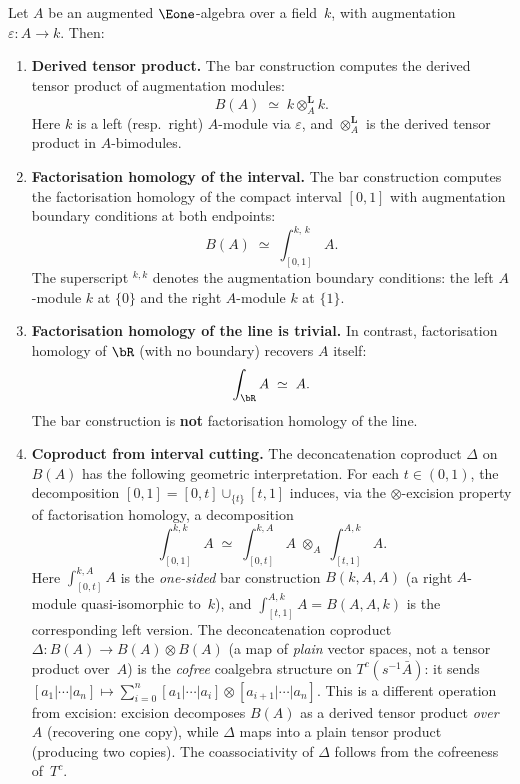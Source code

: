 \begin{proposition}
\label{prop:bar-interval-identification}
Let $A$ be an augmented $\Eone$-algebra over a field~$k$, with
augmentation $\varepsilon \colon A \to k$. Then:
\begin{enumerate}[label=\textup{(\roman*)}]
\item \textbf{Derived tensor product.}
 The bar construction computes the derived tensor product of
 augmentation modules:
 \[
 B(A) \;\simeq\; k \otimes_A^{\mathbf{L}} k.
 \]
 Here $k$ is a left \textup{(}resp.\ right\textup{)} $A$-module via
 $\varepsilon$, and $\otimes_A^{\mathbf{L}}$ is the derived tensor
 product in $A$-bimodules.

\item \textbf{Factorisation homology of the interval.}
 The bar construction computes the factorisation homology of the
 compact interval $[0,1]$ with augmentation boundary conditions at
 both endpoints:
 \[
 B(A) \;\simeq\; \int_{[0,1]}^{k,\,k} A.
 \]
 The superscript ${}^{k,k}$ denotes the augmentation boundary
 conditions: the left $A$-module $k$ at $\{0\}$ and the right
 $A$-module $k$ at $\{1\}$.

\item \textbf{Factorisation homology of the line is trivial.}
 In contrast, factorisation homology of $\bR$ \textup{(}with no
 boundary\textup{)} recovers $A$ itself:
 \[
 \int_{\bR} A \;\simeq\; A.
 \]
 The bar construction is \textbf{not} factorisation homology of
 the line.

\item \textbf{Coproduct from interval cutting.}
 The deconcatenation coproduct $\Delta$ on $B(A)$ has the
 following geometric interpretation.
 For each $t \in (0,1)$, the decomposition
 $[0,1] = [0,t] \cup_{\{t\}} [t,1]$ induces, via the
 $\otimes$-excision property of factorisation homology, a
 decomposition
 \[
 \int_{[0,1]}^{k,k} A
 \;\simeq\;
 \int_{[0,t]}^{k,A} A
 \;\otimes_A\;
 \int_{[t,1]}^{A,k} A.
 \]
 Here $\int_{[0,t]}^{k,A} A$ is the \emph{one-sided} bar
 construction $B(k, A, A)$ (a right $A$-module quasi-isomorphic
 to~$k$), and $\int_{[t,1]}^{A,k} A = B(A, A, k)$ is the
 corresponding left version.
 The deconcatenation coproduct $\Delta \colon B(A) \to B(A)
 \otimes B(A)$ (a map of \emph{plain} vector spaces, not a
 tensor product over~$A$) is the \emph{cofree} coalgebra
 structure on $T^c(s^{-1}\bar{A})$: it sends
 $[a_1|\cdots|a_n] \mapsto \sum_{i=0}^{n}
 [a_1|\cdots|a_i] \otimes [a_{i+1}|\cdots|a_n]$.
 This is a different operation from excision: excision
 decomposes $B(A)$ as a derived tensor product \emph{over}~$A$
 (recovering one copy), while $\Delta$ maps into a plain tensor
 product (producing two copies). The coassociativity of
 $\Delta$ follows from the cofreeness of~$T^c$.
\end{enumerate}
\end{proposition}

